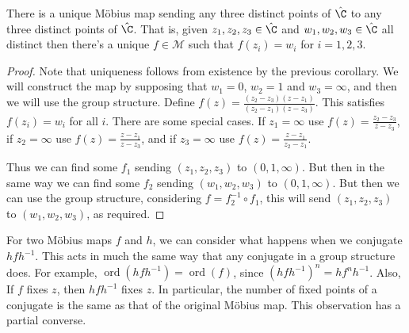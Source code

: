 \begin{theorem}
	There is a unique Möbius map sending any three distinct points of $\hat{\C}$ to any three distinct points of $\hat{\C}$. That is, given $z_1, z_2, z_3 \in \hat{\C}$ and $w_1, w_2, w_3 \in \hat{\C}$ all distinct then there's a unique $f \in \mathcal{M}$ such that $f(z_i) = w_i$ for $i = 1, 2, 3$. 
\end{theorem}
\begin{proof}
	Note that uniqueness follows from existence by the previous corollary. We will construct the map by supposing that $w_1 = 0$, $w_2 = 1$ and $w_3 = \infty$, and then we will use the group structure.
	Define $f(z) = \frac{(z_2 - z_3)(z - z_1)}{(z_2 - z_1)(z - z_3)}$. This satisfies $f(z_i) = w_i$ for all $i$. There are some special cases. If $z_1 = \infty$ use $f(z) = \frac{z_2 - z_3}{z - z_3}$, if $z_2 = \infty$ use $f(z) = \frac{z - z_1}{z - z_3}$, and if $z_3 = \infty$ use $f(z) = \frac{z - z_1}{z_2 - z_1}$.

	Thus we can find some $f_1$ sending $(z_1, z_2, z_3)$ to $(0, 1, \infty)$. But then in the same way we can find some $f_2$ sending $(w_1, w_2, w_3)$ to $(0, 1, \infty)$. But then we can use the group structure, considering $f = f_2^{-1} \circ f_1$, this will send $(z_1, z_2, z_3)$ to $(w_1, w_2, w_3)$, as required.
\end{proof}


For two Möbius maps $f$ and $h$, we can consider what happens when we conjugate $h fh^{-1}$. This acts in much the same way that any conjugate in a group structure does. For example, $\operatorname{ord}(hfh^{-1}) = \operatorname{ord}(f)$, since $(hfh^{-1})^{n} = hf^{n} h^{-1}$. Also, If $f$ fixes $z$, then $h fh^{-1}$ fixes $z$. In particular, the number of fixed points of a conjugate is the same as that of the original Möbius map. This observation has a partial converse.

